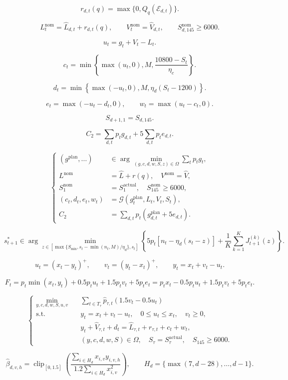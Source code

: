\[
r_{d,t}(q)=\max\{0,Q_q(\mathcal E_{d,t})\}.
\]

\[
L_t^{\mathrm{nom}}=\hat L_{d,t}+r_{d,t}(q),\qquad V_t^{\mathrm{nom}}=\hat V_{d,t},\qquad S_{d,145}^{\mathrm{nom}}\geq6000.
\]

\[
u_t=g_t+V_t-L_t.
\]

\[
c_t=\min\left\{\max(u_t,0),M,\frac{10800-S_t}{\eta_c}\right\}.
\]

\[
d_t=\min\left\{\max(-u_t,0),M,\eta_d(S_t-1200)\right\}.
\]

\[
e_t=\max(-u_t-d_t,0),\qquad w_t=\max(u_t-c_t,0).
\]

\[
S_{d+1,1}=S_{d,145}.
\]

\[
C_2=\sum_{d,t}p_tg_{d,t}+5\sum_{d,t}p_te_{d,t}.
\]

\[
\boxed{\left\{\begin{aligned}(g^{\mathrm{plan}},\ldots)&\in\arg\min_{(g,c,d,w,S,z)\in\Omega}\sum_t p_tg_t,\\L^{\mathrm{nom}}&=\hat L+r(q),\quad V^{\mathrm{nom}}=\hat V,\\S_1^{\mathrm{nom}}&=S_1^{\mathrm{actual}},\quad S_{145}^{\mathrm{nom}}\geq6000,\\(c_t,d_t,e_t,w_t)&=\mathcal G(g_t^{\mathrm{plan}},L_t,V_t,S_t),\\C_2&=\sum_{d,t}p_t(g_{d,t}^{\mathrm{plan}}+5e_{d,t}).\end{aligned}\right.}
\]

\[
s_{t+1}^{*}\in\arg\min_{z\in[\max\{S_{\min},s_t-\min(n_t,M)/\eta_d\},s_t]}\left\{5p_t[n_t-\eta_d(s_t-z)]+\frac1K\sum_{k=1}^{K}J_{t+1}^{(k)}(z)\right\}.
\]

\[
u_t=(x_t-y_t)^+,\qquad v_t=(y_t-x_t)^+,\qquad y_t=x_t+v_t-u_t.
\]

\[
F_t=p_t\min(x_t,y_t)+0.5p_tu_t+1.5p_tv_t+5p_te_t=p_tx_t-0.5p_tu_t+1.5p_tv_t+5p_te_t.
\]

\[
\boxed{\left\{\begin{aligned}\min_{y,c,d,w,S,u,v}\quad&\sum_{t\in T_\tau}\hat p_{\tau,t}(1.5v_t-0.5u_t)\\\mathrm{s.t.}\quad&y_t=x_t+v_t-u_t,\quad0\le u_t\le x_t,\quad v_t\ge0,\\&y_t+\hat V_{\tau,t}+d_t=\hat L_{\tau,t}+r_{\tau,t}+c_t+w_t,\\&(y,c,d,w,S)\in\Omega,\quad S_\tau=S_\tau^{\mathrm{actual}},\quad S_{145}\ge6000.\end{aligned}\right.}
\]

\[
\hat\beta_{d,v,h}=\operatorname{clip}_{[0,1.5]}\left(\frac{\sum_{i\in H_d}x_{i,v}y_{i,v,h}}{1.2\sum_{i\in H_d}x_{i,v}^{2}}\right),\qquad H_d=\{\max(7,d-28),\ldots,d-1\}.
\]

